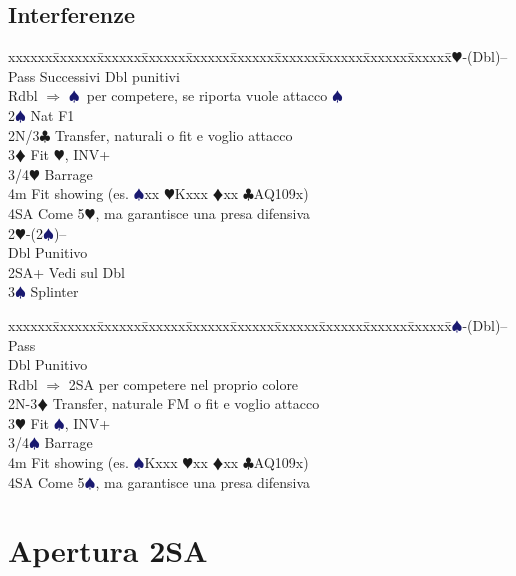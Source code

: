 \documentclass[a4paper,italian]{article}
\newcommand{\BC}{\textcolor{OliveGreen}{$\clubsuit$}}
\newcommand{\BD}{\textcolor{RedOrange}{$\vardiamondsuit$}}
\newcommand{\BH}{\textcolor{Red2}{$\varheartsuit${}}}
\newcommand{\BS}{\textcolor{MidnightBlue}{$\spadesuit${}}}
\newenvironment{bidtable}
{\begin{tabbing}

    xxxxxx\=xxxxxx\=xxxxxx\=xxxxxx\=xxxxxx\=xxxxxx\=xxxxxx\=xxxxxx\=xxxxxx\=xxxxxx\=\kill}
{\end{tabbing} }%
\begin{document}
\begin{multicols*}{2}
    \subsection{Interferenze}

    \begin{bidtable}
        2\BH-(Dbl)--\+\\
        Pass\> Successivi Dbl punitivi\\
        Rdbl\> $\Rightarrow$ \BS\ per competere, se riporta vuole attacco \BS\\
        2\BS\> Nat F1\\
        2N/3\BC\> Transfer, naturali o fit e voglio attacco\\
        3\BD\> Fit \BH, INV+\\
        3/4\BH\> Barrage\\
        4m\> Fit showing (es. \BS xx \BH Kxxx \BD xx \BC AQ109x)\\
        4SA\> Come 5\BH, ma garantisce una presa difensiva\-\\
        2\BH-(2\BS)--\+\\
        Dbl\> Punitivo\\
        2SA+\> Vedi sul Dbl\\
        3\BS\> Splinter\\
    \end{bidtable}

    \begin{bidtable}
        2\BS-(Dbl)--\+\\
        Pass\+\\
        Dbl\> Punitivo\-\\
        Rdbl\> $\Rightarrow$ 2SA per competere nel proprio colore\\
        2N-3\BD\> Transfer, naturale FM o fit e voglio attacco\\
        3\BH\> Fit \BS, INV+\\
        3/4\BS\> Barrage\\
        4m\> Fit showing (es. \BS Kxxx \BH xx \BD xx \BC AQ109x)\\
        4SA\> Come 5\BS, ma garantisce una presa difensiva\\
    \end{bidtable}

\end{multicols*}

\pagebreak

\section{Apertura 2SA}
\end{document}
